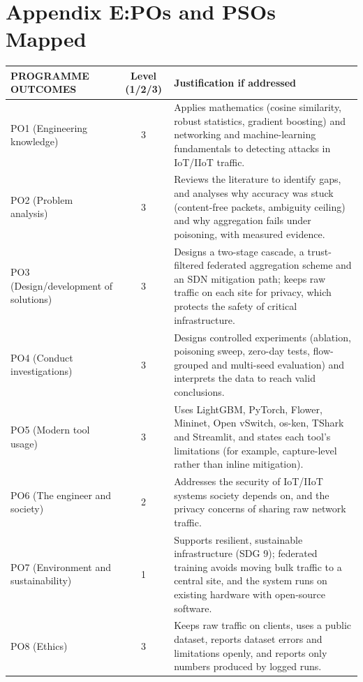 \documentclass[12pt,a4paper]{report}
\begin{document}
\section {Appendix E:POs and PSOs Mapped}
\begin{table}[h!]
\centering
\small
\renewcommand{\arraystretch}{1.05} %
\setlength{\tabcolsep}{6pt}       %
\begin{tabular}{|>{\raggedright\arraybackslash}p{3.6cm}|c|p{7.9cm}|}
\hline
\textbf{PROGRAMME OUTCOMES} & \textbf{Level (1/2/3)} & \textbf{Justification if addressed} \\
\hline
PO1 (Engineering knowledge) & 3 & Applies mathematics (cosine similarity, robust statistics, gradient boosting) and networking and machine-learning fundamentals to detecting attacks in IoT/IIoT traffic. \\
\hline
PO2 (Problem analysis) & 3 & Reviews the literature to identify gaps, and analyses why accuracy was stuck (content-free packets, ambiguity ceiling) and why aggregation fails under poisoning, with measured evidence. \\
\hline
PO3 (Design/development of solutions) & 3 & Designs a two-stage cascade, a trust-filtered federated aggregation scheme and an SDN mitigation path; keeps raw traffic on each site for privacy, which protects the safety of critical infrastructure. \\
\hline
PO4 (Conduct investigations) & 3 & Designs controlled experiments (ablation, poisoning sweep, zero-day tests, flow-grouped and multi-seed evaluation) and interprets the data to reach valid conclusions. \\
\hline
PO5 (Modern tool usage) & 3 & Uses LightGBM, PyTorch, Flower, Mininet, Open vSwitch, os-ken, TShark and Streamlit, and states each tool's limitations (for example, capture-level rather than inline mitigation). \\
\hline
PO6 (The engineer and society) & 2 & Addresses the security of IoT/IIoT systems society depends on, and the privacy concerns of sharing raw network traffic. \\
\hline
PO7 (Environment and sustainability) & 1 & Supports resilient, sustainable infrastructure (SDG 9); federated training avoids moving bulk traffic to a central site, and the system runs on existing hardware with open-source software. \\
\hline
PO8 (Ethics) & 3 & Keeps raw traffic on clients, uses a public dataset, reports dataset errors and limitations openly, and reports only numbers produced by logged runs. \\

\end{tabular}
\end{table}
\end{document}
